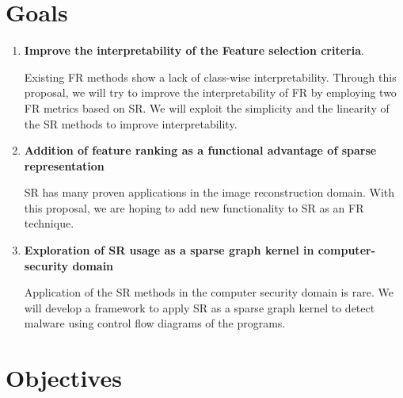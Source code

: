 \section{Goals}

\begin{enumerate}
    \item \textbf{Improve the interpretability of the Feature selection criteria}.
    
    Existing FR methods show a lack of class-wise interpretability. Through this proposal, we will try to improve the interpretability of FR by employing two FR metrics based on SR\@. We will exploit the simplicity and the linearity of the SR methods to improve interpretability.
    
    \item \textbf{Addition of feature ranking as a functional advantage of sparse representation}
    
    SR has many proven applications in the image reconstruction domain. With this proposal, we are hoping to add new functionality to SR as an FR technique.  
    \item \textbf{Exploration of SR usage as a  sparse graph kernel in computer-security domain}
    
    Application of the SR methods in the computer security domain is rare. We will develop a framework to apply SR as a sparse graph kernel to detect malware using control flow diagrams of the programs.
\end{enumerate}


\section{Objectives}


